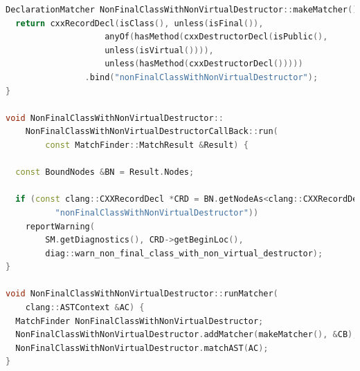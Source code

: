 \documentclass[12pt,oneside]{memoir}
\begin{document}
\begin{lstlisting}[caption={Primer upariv\v{c}a koji pronalazi sve klase koje nisu obeležene atributom \lstinline{final} i čiji destruktor nije virtuelan, CallBack klase i poziva upariva\v{c}a}, label=lst:label7,language=C++, captionpos=b]
DeclarationMatcher NonFinalClassWithNonVirtualDestructor::makeMatcher() {
  return cxxRecordDecl(isClass(), unless(isFinal()),
                    anyOf(hasMethod(cxxDestructorDecl(isPublic(),
                    unless(isVirtual()))),
                    unless(hasMethod(cxxDestructorDecl()))))
                .bind("nonFinalClassWithNonVirtualDestructor");
}

void NonFinalClassWithNonVirtualDestructor::
    NonFinalClassWithNonVirtualDestructorCallBack::run(
        const MatchFinder::MatchResult &Result) {

  const BoundNodes &BN = Result.Nodes;
  
  if (const clang::CXXRecordDecl *CRD = BN.getNodeAs<clang::CXXRecordDecl>(
          "nonFinalClassWithNonVirtualDestructor"))
    reportWarning(
        SM.getDiagnostics(), CRD->getBeginLoc(),
        diag::warn_non_final_class_with_non_virtual_destructor);
}

void NonFinalClassWithNonVirtualDestructor::runMatcher(
    clang::ASTContext &AC) {
  MatchFinder NonFinalClassWithNonVirtualDestructor;
  NonFinalClassWithNonVirtualDestructor.addMatcher(makeMatcher(), &CB);
  NonFinalClassWithNonVirtualDestructor.matchAST(AC);
}
\end{lstlisting}
\end{document}
